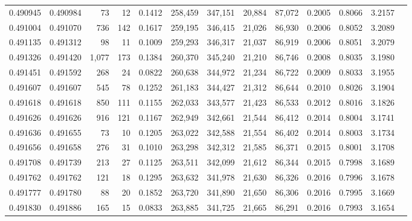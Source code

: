 \begin{tabular}{rrrrrrrrrrrrr}
0.490945 & 0.490984 &    73 &    12 &                                     0.1412 & 258,459 & 347,151 &  20,884 &  87,072 & 0.2005 & 0.8066 & 3.2157 \\
0.491004 & 0.491070 &   736 &   142 &                                     0.1617 & 259,195 & 346,415 &  21,026 &  86,930 & 0.2006 & 0.8052 & 3.2089 \\
0.491135 & 0.491312 &    98 &    11 &                                     0.1009 & 259,293 & 346,317 &  21,037 &  86,919 & 0.2006 & 0.8051 & 3.2079 \\
0.491326 & 0.491420 & 1,077 &   173 &                                     0.1384 & 260,370 & 345,240 &  21,210 &  86,746 & 0.2008 & 0.8035 & 3.1980 \\
0.491451 & 0.491592 &   268 &    24 &                                     0.0822 & 260,638 & 344,972 &  21,234 &  86,722 & 0.2009 & 0.8033 & 3.1955 \\
0.491607 & 0.491607 &   545 &    78 &                                     0.1252 & 261,183 & 344,427 &  21,312 &  86,644 & 0.2010 & 0.8026 & 3.1904 \\
0.491618 & 0.491618 &   850 &   111 &                                     0.1155 & 262,033 & 343,577 &  21,423 &  86,533 & 0.2012 & 0.8016 & 3.1826 \\
0.491626 & 0.491626 &   916 &   121 &                                     0.1167 & 262,949 & 342,661 &  21,544 &  86,412 & 0.2014 & 0.8004 & 3.1741 \\
0.491636 & 0.491655 &    73 &    10 &                                     0.1205 & 263,022 & 342,588 &  21,554 &  86,402 & 0.2014 & 0.8003 & 3.1734 \\
0.491656 & 0.491658 &   276 &    31 &                                     0.1010 & 263,298 & 342,312 &  21,585 &  86,371 & 0.2015 & 0.8001 & 3.1708 \\
0.491708 & 0.491739 &   213 &    27 &                                     0.1125 & 263,511 & 342,099 &  21,612 &  86,344 & 0.2015 & 0.7998 & 3.1689 \\
0.491762 & 0.491762 &   121 &    18 &                                     0.1295 & 263,632 & 341,978 &  21,630 &  86,326 & 0.2016 & 0.7996 & 3.1678 \\
0.491777 & 0.491780 &    88 &    20 &                                     0.1852 & 263,720 & 341,890 &  21,650 &  86,306 & 0.2016 & 0.7995 & 3.1669 \\
0.491830 & 0.491886 &   165 &    15 &                                     0.0833 & 263,885 & 341,725 &  21,665 &  86,291 & 0.2016 & 0.7993 & 3.1654 \\

\end{tabular}
